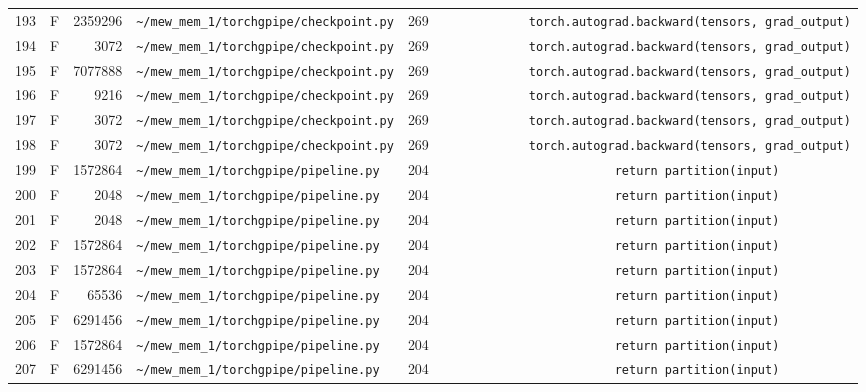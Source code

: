 \documentclass{article}
\begin{document}
\begin{longtable}{r l r p{6.5cm} r p{7.0cm}}
193 & F & 2359296 & \lstinline|~/mew_mem_1/torchgpipe/checkpoint.py| & 269 & \lstinline|            torch.autograd.backward(tensors, grad_output)| \\
194 & F & 3072 & \lstinline|~/mew_mem_1/torchgpipe/checkpoint.py| & 269 & \lstinline|            torch.autograd.backward(tensors, grad_output)| \\
195 & F & 7077888 & \lstinline|~/mew_mem_1/torchgpipe/checkpoint.py| & 269 & \lstinline|            torch.autograd.backward(tensors, grad_output)| \\
196 & F & 9216 & \lstinline|~/mew_mem_1/torchgpipe/checkpoint.py| & 269 & \lstinline|            torch.autograd.backward(tensors, grad_output)| \\
197 & F & 3072 & \lstinline|~/mew_mem_1/torchgpipe/checkpoint.py| & 269 & \lstinline|            torch.autograd.backward(tensors, grad_output)| \\
198 & F & 3072 & \lstinline|~/mew_mem_1/torchgpipe/checkpoint.py| & 269 & \lstinline|            torch.autograd.backward(tensors, grad_output)| \\
199 & F & 1572864 & \lstinline|~/mew_mem_1/torchgpipe/pipeline.py| & 204 & \lstinline|                        return partition(input)| \\
200 & F & 2048 & \lstinline|~/mew_mem_1/torchgpipe/pipeline.py| & 204 & \lstinline|                        return partition(input)| \\
201 & F & 2048 & \lstinline|~/mew_mem_1/torchgpipe/pipeline.py| & 204 & \lstinline|                        return partition(input)| \\
202 & F & 1572864 & \lstinline|~/mew_mem_1/torchgpipe/pipeline.py| & 204 & \lstinline|                        return partition(input)| \\
203 & F & 1572864 & \lstinline|~/mew_mem_1/torchgpipe/pipeline.py| & 204 & \lstinline|                        return partition(input)| \\
204 & F & 65536 & \lstinline|~/mew_mem_1/torchgpipe/pipeline.py| & 204 & \lstinline|                        return partition(input)| \\
205 & F & 6291456 & \lstinline|~/mew_mem_1/torchgpipe/pipeline.py| & 204 & \lstinline|                        return partition(input)| \\
206 & F & 1572864 & \lstinline|~/mew_mem_1/torchgpipe/pipeline.py| & 204 & \lstinline|                        return partition(input)| \\
207 & F & 6291456 & \lstinline|~/mew_mem_1/torchgpipe/pipeline.py| & 204 & \lstinline|                        return partition(input)| \\

\end{longtable}
\end{document}
